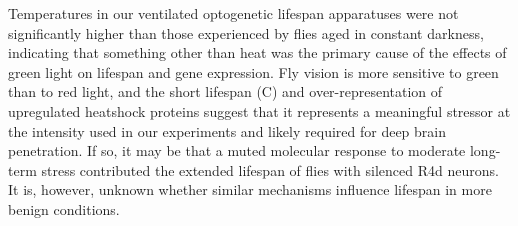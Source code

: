 Temperatures in our ventilated optogenetic lifespan apparatuses were not significantly higher than those experienced by flies aged in constant darkness, indicating that something other than heat was the primary cause of the effects of green light on lifespan and gene expression. 
Fly vision is more sensitive to green than to red light,\cite{salcedo1999} and the short lifespan (C) and over-representation of upregulated heatshock proteins suggest that it represents a meaningful stressor at the intensity used in our experiments and likely required for deep brain penetration. 
If so, it may be that a muted molecular response to moderate long-term stress contributed the extended lifespan of flies with silenced R4d neurons. It is, however, unknown whether similar mechanisms influence lifespan in more benign conditions. 

